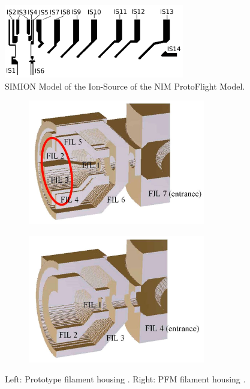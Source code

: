 	\begin{figure}[h] %
		\centering
		\includegraphics[width=0.7\textwidth]{Setup/ISFlight_bearb.png}
		\caption{SIMION Model of the Ion-Source of the NIM ProtoFlight Model.}
		\label{fig:SetupPFMISSim}
	\end{figure}
	\begin{figure}[h!] %
		\begin{subfigure}{0.5\textwidth}
			\centering
			\includegraphics[width =0.85\textwidth]{Setup/Proto_FilEl_sim.jpg}
		\end{subfigure}
		\begin{subfigure}{0.5\textwidth}
			\centering
			\includegraphics[width = 0.85\textwidth]{Setup/PFM_FilEl_sim.jpg}
		\end{subfigure}
		\caption{Left: Prototype filament housing \cite{Diss_Meyer}. Right: PFM filament housing \cite{Diss_Meyer}.}
		\label{fig:SetupFilElSim}
	\end{figure}
	
